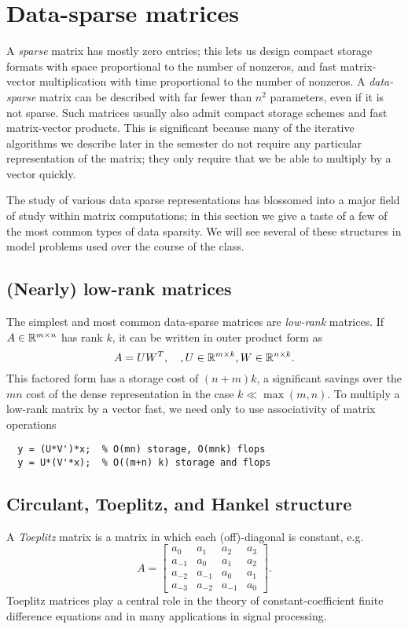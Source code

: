 \section{Data-sparse matrices}

A {\em sparse} matrix has mostly zero entries; this lets us design
compact storage formats with space proportional to the number of nonzeros,
and fast matrix-vector multiplication with time proportional to the
number of nonzeros.  A {\em data-sparse} matrix can be described with
far fewer than $n^2$ parameters, even if it is not sparse.  Such matrices
usually also admit compact storage schemes and fast matrix-vector products.
This is significant because many of the iterative algorithms we
describe later in the semester do not require any particular representation
of the matrix; they only require that we be able to multiply by a vector
quickly.

The study of various data sparse representations has blossomed into a
major field of study within matrix computations; in this section we give
a taste of a few of the most common types of data sparsity.  We will
see several of these structures in model problems used over the course
of the class.

\subsection{(Nearly) low-rank matrices}

The simplest and most common data-sparse matrices are {\em low-rank}
matrices.  If $A \in \mathbb{R}^{m \times n}$ has rank $k$, it can be written
in outer product form as
\[
  A = UW^T, \quad, U \in \mathbb{R}^{m \times k}, W \in \mathbb{R}^{n \times k}.
\]
This factored form has a storage cost of $(n+m) k$, a significant savings
over the $mn$ cost of the dense representation in the case $k \ll \max(m,n)$.
To multiply a low-rank matrix by a vector fast, we need only to use
associativity of matrix operations
\begin{lstlisting}
  y = (U*V')*x;  % O(mn) storage, O(mnk) flops
  y = U*(V'*x);  % O((m+n) k) storage and flops
\end{lstlisting}

\subsection{Circulant, Toeplitz, and Hankel structure}

A {\em Toeplitz} matrix is a matrix in which each (off)-diagonal is
constant, e.g.
\[
  A =
  \begin{bmatrix}
    a_0    & a_1    & a_2    & a_3 \\
    a_{-1} & a_0    & a_1    & a_2 \\
    a_{-2} & a_{-1} & a_0    & a_1 \\
    a_{-3} & a_{-2} & a_{-1} & a_0
  \end{bmatrix}.
\]
Toeplitz matrices play a central role in the theory of constant-coefficient
finite difference equations and in many applications in signal processing.


